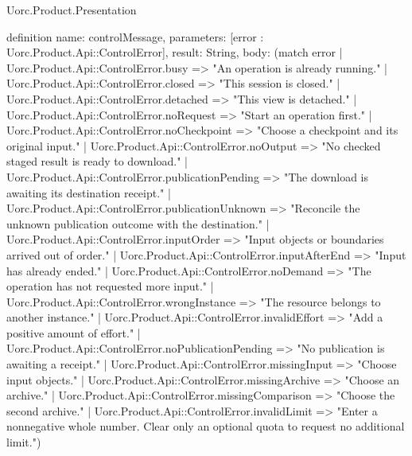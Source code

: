 \begin{lexlean}{Uorc.Product.Presentation}
\begin{semanticmodule}
definition{
  name: controlMessage,
  parameters: [error : Uorc.Product.Api::ControlError],
  result: String,
  body: (match error
    | Uorc.Product.Api::ControlError.busy => "An operation is already running."
    | Uorc.Product.Api::ControlError.closed => "This session is closed."
    | Uorc.Product.Api::ControlError.detached => "This view is detached."
    | Uorc.Product.Api::ControlError.noRequest => "Start an operation first."
    | Uorc.Product.Api::ControlError.noCheckpoint => "Choose a checkpoint and its original input."
    | Uorc.Product.Api::ControlError.noOutput => "No checked staged result is ready to download."
    | Uorc.Product.Api::ControlError.publicationPending => "The download is awaiting its destination receipt."
    | Uorc.Product.Api::ControlError.publicationUnknown => "Reconcile the unknown publication outcome with the destination."
    | Uorc.Product.Api::ControlError.inputOrder => "Input objects or boundaries arrived out of order."
    | Uorc.Product.Api::ControlError.inputAfterEnd => "Input has already ended."
    | Uorc.Product.Api::ControlError.noDemand => "The operation has not requested more input."
    | Uorc.Product.Api::ControlError.wrongInstance => "The resource belongs to another instance."
    | Uorc.Product.Api::ControlError.invalidEffort => "Add a positive amount of effort."
    | Uorc.Product.Api::ControlError.noPublicationPending => "No publication is awaiting a receipt."
    | Uorc.Product.Api::ControlError.missingInput => "Choose input objects."
    | Uorc.Product.Api::ControlError.missingArchive => "Choose an archive."
    | Uorc.Product.Api::ControlError.missingComparison => "Choose the second archive."
    | Uorc.Product.Api::ControlError.invalidLimit => "Enter a nonnegative whole number. Clear only an optional quota to request no additional limit.")
}


\end{semanticmodule}
\end{lexlean}
